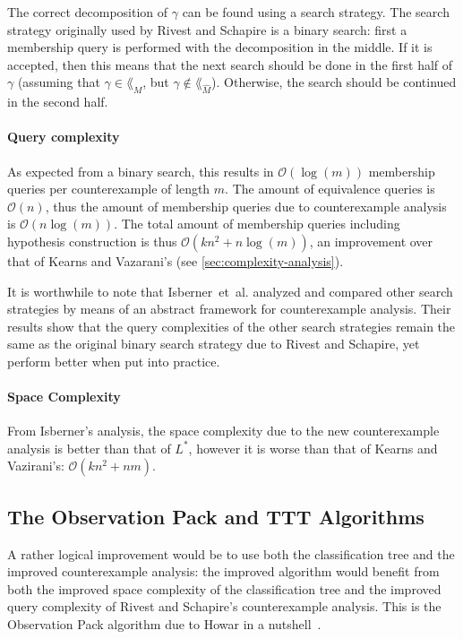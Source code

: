 The correct decomposition of $\gamma$ can be found using a search strategy. The
search strategy originally used by Rivest and Schapire is a binary search: first
a membership query is performed with the decomposition in the middle. If it is
accepted, then this means that the next search should be done in the first half
of $\gamma$ (assuming that $\gamma \in \lang_M$, but
$\gamma \not\in \lang_{\hat M}$). Otherwise, the search should be continued in
the second half.

\paragraph{Query complexity} As expected from a binary search, this results in
$\mathcal{O}(\log(m))$ membership queries per counterexample of length $m$. The
amount of equivalence queries is $\mathcal{O}(n)$, thus the amount of membership
queries due to counterexample analysis is $\mathcal{O}(n\log(m))$. The total
amount of membership queries including hypothesis construction is thus
$\mathcal{O}(kn^2 + n\log(m))$, an improvement over that of Kearns and
Vazarani's (see \cref{sec:complexity-analysis}).

It is worthwhile to note that Isberner~et~al. analyzed and compared other search
strategies by means of an abstract framework for counterexample
analysis\cite{Isberner2014a}. Their results show that the query complexities of
the other search strategies remain the same as the original binary search
strategy due to Rivest and Schapire, yet perform better when put into practice.

\paragraph{Space Complexity} From Isberner's analysis\cite{Isberner2014b}, the
space complexity due to the new counterexample analysis is better than that of
$L^*$, however it is worse than that of Kearns and Vazirani's:
$\mathcal{O}(kn^2 + nm)$.

\subsection{The Observation Pack and TTT Algorithms}
\label{sec:ttt}
A rather logical improvement would be to use both the classification tree and
the improved counterexample analysis: the improved algorithm would benefit from
both the improved space complexity of the classification tree and the improved
query complexity of Rivest and Schapire's counterexample analysis. This is the
Observation Pack algorithm due to Howar in a
nutshell~\cite{Howar2012a,Isberner2015a}.

